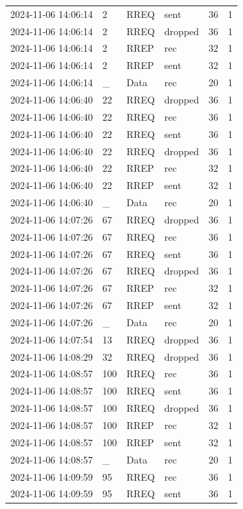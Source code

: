 \documentclass[]{nsm-thesis}
\begin{document}
\begin{longtable}{llllll}
2024-11-06 14:06:14 & 2 & RREQ & sent & 36 & 1 \\
2024-11-06 14:06:14 & 2 & RREQ & dropped & 36 & 1 \\
2024-11-06 14:06:14 & 2 & RREP & rec & 32 & 1 \\
2024-11-06 14:06:14 & 2 & RREP & sent & 32 & 1 \\
2024-11-06 14:06:14 & _ & Data & rec & 20 & 1 \\
2024-11-06 14:06:40 & 22 & RREQ & dropped & 36 & 1 \\
2024-11-06 14:06:40 & 22 & RREQ & rec & 36 & 1 \\
2024-11-06 14:06:40 & 22 & RREQ & sent & 36 & 1 \\
2024-11-06 14:06:40 & 22 & RREQ & dropped & 36 & 1 \\
2024-11-06 14:06:40 & 22 & RREP & rec & 32 & 1 \\
2024-11-06 14:06:40 & 22 & RREP & sent & 32 & 1 \\
2024-11-06 14:06:40 & _ & Data & rec & 20 & 1 \\
2024-11-06 14:07:26 & 67 & RREQ & dropped & 36 & 1 \\
2024-11-06 14:07:26 & 67 & RREQ & rec & 36 & 1 \\
2024-11-06 14:07:26 & 67 & RREQ & sent & 36 & 1 \\
2024-11-06 14:07:26 & 67 & RREQ & dropped & 36 & 1 \\
2024-11-06 14:07:26 & 67 & RREP & rec & 32 & 1 \\
2024-11-06 14:07:26 & 67 & RREP & sent & 32 & 1 \\
2024-11-06 14:07:26 & _ & Data & rec & 20 & 1 \\
2024-11-06 14:07:54 & 13 & RREQ & dropped & 36 & 1 \\
2024-11-06 14:08:29 & 32 & RREQ & dropped & 36 & 1 \\
2024-11-06 14:08:57 & 100 & RREQ & rec & 36 & 1 \\
2024-11-06 14:08:57 & 100 & RREQ & sent & 36 & 1 \\
2024-11-06 14:08:57 & 100 & RREQ & dropped & 36 & 1 \\
2024-11-06 14:08:57 & 100 & RREP & rec & 32 & 1 \\
2024-11-06 14:08:57 & 100 & RREP & sent & 32 & 1 \\
2024-11-06 14:08:57 & _ & Data & rec & 20 & 1 \\
2024-11-06 14:09:59 & 95 & RREQ & rec & 36 & 1 \\
2024-11-06 14:09:59 & 95 & RREQ & sent & 36 & 1 \\

\end{longtable}
\end{document}
